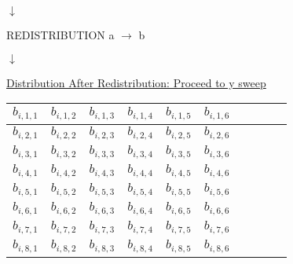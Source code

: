\documentclass[11pt,doublespace]{article}
\begin{document}
\begin{center}
$\downarrow$
\end{center}

\begin{center}
{\Large REDISTRIBUTION a $\rightarrow$ b }
\end{center}

\begin{center}
$\downarrow$
\end{center}

\centerline{\underline{Distribution After Redistribution: Proceed to y sweep}}
\medskip
\begin{center}
\begin{tabular}{|c|c|c||c|c|c|c|c|c|c|} 
\hline
$ b_{i,1,1}$ & $b_{i,1,2}$ & $b_{i,1,3}$ & $b_{i,1,4}$ & $b_{i,1,5}$ & $b_{i,1,6}$ \\
\hline
$ b_{i,2,1}$ & $b_{i,2,2}$ & $b_{i,2,3}$ & $b_{i,2,4}$ & $b_{i,2,5}$ & $b_{i,2,6}$ \\
\hline
$ b_{i,3,1}$ & $b_{i,3,2}$ & $b_{i,3,3}$ & $b_{i,3,4}$ & $b_{i,3,5}$ & $b_{i,3,6}$ \\
\hline
$ b_{i,4,1}$ & $b_{i,4,2}$ & $b_{i,4,3}$ & $b_{i,4,4}$ & $b_{i,4,5}$ & $b_{i,4,6}$ \\
\hline\hline\hline
$ b_{i,5,1}$ & $b_{i,5,2}$ & $b_{i,5,3}$ & $b_{i,5,4}$ & $b_{i,5,5}$ & $b_{i,5,6}$ \\
\hline
$ b_{i,6,1}$ & $b_{i,6,2}$ & $b_{i,6,3}$ & $b_{i,6,4}$ & $b_{i,6,5}$ & $b_{i,6,6}$\\
\hline
$ b_{i,7,1}$ & $b_{i,7,2}$ & $b_{i,7,3}$ & $b_{i,7,4}$ & $b_{i,7,5}$ & $b_{i,7,6}$\\
\hline
$ b_{i,8,1}$ & $b_{i,8,2}$ & $b_{i,8,3}$ & $b_{i,8,4}$ & $b_{i,8,5}$ & $b_{i,8,6}$\\
\hline
\end{tabular}
\end{center}
\end{document}
